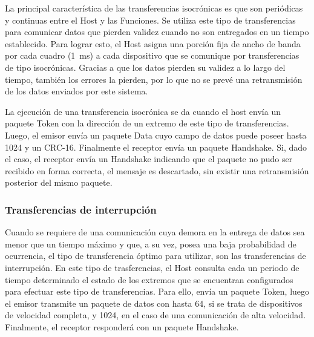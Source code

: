 	La principal característica de las transferencias isocrónicas es que son periódicas y continuas entre el Host y las Funciones. Se utiliza este tipo de transferencias para comunicar datos que pierden validez cuando no son entregados en un tiempo establecido. Para lograr esto, el Host asigna una porción fija de ancho de banda por cada cuadro (\SI{1}{\milli\second}) a cada dispositivo que se comunique por transferencias de tipo isocrónicas. Gracias a que los datos pierden su validez a lo largo del tiempo, también los errores la pierden, por lo que no se prevé una retransmisión de los datos enviados por este sistema.%
	
	La ejecución de una transferencia isocrónica se da cuando el host envía un paquete Token con la dirección de un extremo de este tipo de transferencias. Luego, el emisor envía un paquete Data cuyo campo de datos puede poseer hasta \SI{1024}{\byte} y un CRC-16. Finalmente el receptor envía un paquete Handshake. Si, dado el caso, el receptor envía un Handshake indicando que el paquete no pudo ser recibido en forma correcta, el mensaje es descartado, sin existir una retransmisión posterior del mismo paquete.
	
\subsubsection{Transferencias de interrupción}
	Cuando se requiere de una comunicación cuya demora en la entrega de datos sea menor que un tiempo máximo y que, a su vez, posea una baja probabilidad de ocurrencia, el tipo de transferencia óptimo para utilizar, son las transferencias de interrupción. En este tipo de trasferencias, el Host consulta cada un periodo de tiempo determinado el estado de los extremos que se encuentran configurados para efectuar este tipo de transferencias. Para ello, envía un paquete Token, luego el emisor transmite un paquete de datos con hasta \SI{64}{\byte}, si se trata de dispositivos de velocidad completa, y \SI{1024}{\byte}, en el caso de una comunicación de alta velocidad. Finalmente, el receptor responderá con un paquete Handshake.
